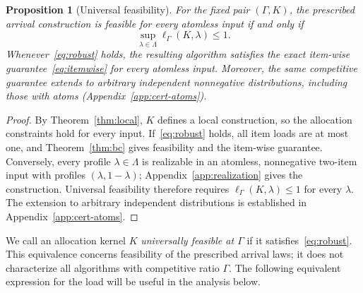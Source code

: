 \documentclass[11pt]{article}
\newtheorem{proposition}[theorem]{Proposition}
\theoremstyle{definition}
\theoremstyle{remark}
\begin{document}
\begin{proposition}[Universal feasibility]\label{prop:scalar-feasibility}
For the fixed pair $(\Gamma,K)$, the prescribed arrival construction
is feasible for every atomless input if and only if
\begin{equation}\label{eq:robust}
 \sup_{\lambda\in\Lambda}\ell_\Gamma(K,\lambda)\le1.
\end{equation}
Whenever~\eqref{eq:robust} holds, the resulting algorithm satisfies
the exact item-wise guarantee~\eqref{eq:itemwise} for every atomless
input. Moreover, the same competitive guarantee extends to arbitrary
independent nonnegative distributions, including those with atoms
(Appendix~\ref{app:cert-atoms}).
\end{proposition}
\begin{proof}
By Theorem~\ref{thm:local}, $K$ defines a local construction, so the allocation constraints hold for every input.
If~\eqref{eq:robust} holds, all item loads are at most one, and Theorem~\ref{thm:bc} gives feasibility and the item-wise guarantee.
Conversely, every profile $\lambda\in\Lambda$ is realizable in an atomless, nonnegative two-item input with profiles $(\lambda,1-\lambda)$; Appendix~\ref{app:realization} gives the construction.
Universal feasibility therefore requires $\ell_\Gamma(K,\lambda)\le1$ for every $\lambda$. The extension to arbitrary independent distributions
is established in Appendix~\ref{app:cert-atoms}.
\end{proof}

We call an allocation kernel $K$ \emph{universally feasible at $\Gamma$}
if it satisfies~\eqref{eq:robust}.
This equivalence concerns feasibility of the prescribed arrival laws; it does not characterize all algorithms with competitive ratio $\Gamma$.
The following equivalent expression for the load will be useful in the analysis below.
\end{document}
